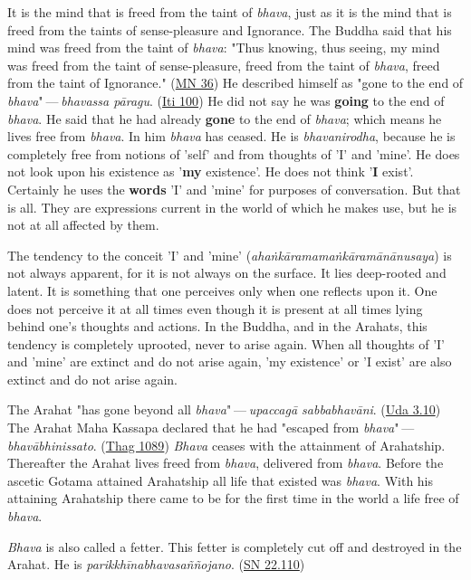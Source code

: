 It is the mind that is freed from the taint of \emph{bhava}, just as it is
the mind that is freed from the taints of sense-pleasure and
Ignorance. The Buddha said that his mind was freed from the taint of
\emph{bhava}: "Thus knowing, thus seeing, my mind was freed from the taint
of sense-pleasure, freed from the taint of \emph{bhava}, freed from the
taint of Ignorance." (\href{https://suttacentral.net/mn36/en/bodhi}{MN 36}) He described himself
as "gone to the end of \emph{bhava}" — \emph{bhavassa
pāragu}. (\href{https://suttacentral.net/iti100/en/sujato}{Iti 100}) He did not say he was \textbf{going} to the
end of \emph{bhava}. He said that he had already \textbf{gone} to the end of
\emph{bhava}; which means he lives free from \emph{bhava}. In him \emph{bhava} has
ceased. He is \emph{bhavanirodha}, because he is completely free from
notions of 'self' and from thoughts of 'I' and 'mine'. He does not look
upon his existence as '\textbf{my} existence'. He does not think '\textbf{I} exist'.
Certainly he uses the \textbf{words} 'I' and 'mine' for purposes of
conversation. But that is all. They are expressions current in the world
of which he makes use, but he is not at all affected by them.


The tendency to the conceit 'I' and 'mine'
(\emph{ahaṅkāramamaṅkāramānānusaya}) is not always apparent, for it is not
always on the surface. It lies deep-rooted and latent. It is something
that one perceives only when one reflects upon it. One does not perceive
it at all times even though it is present at all times lying behind
one’s thoughts and actions. In the Buddha, and in the Arahats, this
tendency is completely uprooted, never to arise again. When all thoughts
of 'I' and 'mine' are extinct and do not arise again, 'my existence' or
'I exist' are also extinct and do not arise again.


The Arahat "has gone beyond all \emph{bhava}" — \emph{upaccagā
sabbabhavāni}. (\href{https://suttacentral.net/ud3.10/en/sujato}{Uda 3.10}) The Arahat
Maha Kassapa declared that he had "escaped from \emph{bhava}" — \emph{bhavābhinissato}. (\href{https://suttacentral.net/thag18.1/en/sujato}{Thag 1089}) \emph{Bhava} ceases with the
attainment of Arahatship. Thereafter the Arahat lives freed from
\emph{bhava}, delivered from \emph{bhava}. Before the ascetic Gotama attained
Arahatship all life that existed was \emph{bhava}. With his attaining
Arahatship there came to be for the first time in the world a life free
of \emph{bhava}.


\emph{Bhava} is also called a fetter. This fetter is completely cut off and
destroyed in the Arahat. He is \emph{parikkhīnabhavasaññojano}. (\href{https://suttacentral.net/sn22.110/en/sujato}{SN 22.110})


